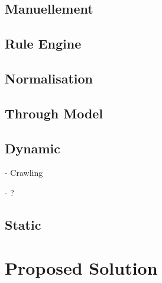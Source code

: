 \documentclass[conference]{IEEEtran}
\begin{document}
\subsection{Manuellement}
\label{sec:Manually}

\subsection{Rule Engine}
\label{sec:ruleEngine}

\subsection*{Normalisation}

\subsection{Through Model}
\label{sec:throughModel}

\subsection*{Dynamic}

- Crawling 

- ? 

\subsection*{Static}







\section{Proposed Solution}
\label{sec:contribution}

\end{document}
